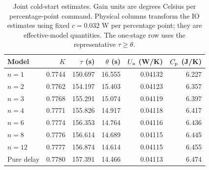 \begin{table}[tbp]
\centering
\small
\begin{tabular}{lrrrrr}
\toprule
Model & $K$ & $\tau$ (s) & $\theta$ (s) & $U_{\mathrm a}$ (W/K) & $C_{\mathrm p}$ (J/K) \\
\midrule
$n=1$ & 0.7744 & 150.697 & 16.555 & 0.04132 & 6.227 \\
$n=2$ & 0.7762 & 154.197 & 15.403 & 0.04123 & 6.357 \\
$n=3$ & 0.7768 & 155.291 & 15.074 & 0.04119 & 6.397 \\
$n=4$ & 0.7771 & 155.826 & 14.917 & 0.04118 & 6.417 \\
$n=6$ & 0.7774 & 156.353 & 14.764 & 0.04116 & 6.436 \\
$n=8$ & 0.7776 & 156.614 & 14.689 & 0.04115 & 6.445 \\
$n=12$ & 0.7777 & 156.874 & 14.614 & 0.04115 & 6.455 \\
Pure delay & 0.7780 & 157.391 & 14.466 & 0.04113 & 6.474 \\
\bottomrule
\end{tabular}
\caption{Joint cold-start estimates. Gain units are degrees Celsius per percentage-point command. Physical columns transform the IO estimates using fixed $c=0.032$ W per percentage point; they are effective-model quantities. The one-stage row uses the representative $\tau\geq\theta$.}
\label{tab:joint-parameters}
\end{table}
